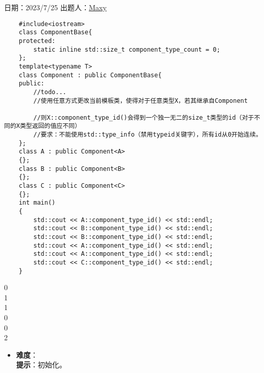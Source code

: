 日期：2023/7/25 出题人：\href{ https://b23.tv/FM0evat}{Maxy}\\

\begin{verbatim}
    #include<iostream>
    class ComponentBase{
    protected:
        static inline std::size_t component_type_count = 0;
    };
    template<typename T>
    class Component : public ComponentBase{
    public:
        //todo...
        //使用任意方式更改当前模板类，使得对于任意类型X，若其继承自Component
    
        //则X::component_type_id()会得到一个独一无二的size_t类型的id（对于不同的X类型返回的值应不同）
        //要求：不能使用std::type_info（禁用typeid关键字），所有id从0开始连续。
    };
    class A : public Component<A>
    {};
    class B : public Component<B>
    {};
    class C : public Component<C>
    {};
    int main()
    {
        std::cout << A::component_type_id() << std::endl;
        std::cout << B::component_type_id() << std::endl;
        std::cout << B::component_type_id() << std::endl;
        std::cout << A::component_type_id() << std::endl;
        std::cout << A::component_type_id() << std::endl;
        std::cout << C::component_type_id() << std::endl;
    }
\end{verbatim}

\begin{tcolorbox}[title = {要求运行结果},
        fonttitle = \bfseries, fontupper = \sffamily, fontlower = \itshape]
    0\\
    1\\
    1\\
    0\\
    0\\
    2
\end{tcolorbox}

\begin{itemize}
    \item \textbf{难度}：  \\
          \textbf{提示}：初始化。
\end{itemize}